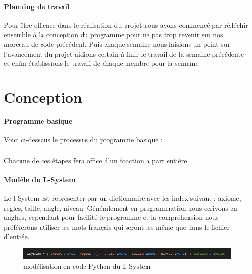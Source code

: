 \documentclass{report}
\begin{document}
 		\paragraph{Planning de travail}
 			Pour être efficace dans le réalisation du projet nous avons commencé par réfléchir ensemble à la conception du programme pour ne pas trop revenir sur nos morceau de code précédent. Puis chaque semaine nous faisions un point sur l'avancement du projet aidions certain à finir le travail de la semaine précédente et enfin établissions le travail de chaque membre pour la semaine 
 	
 	\section{Conception}
 		\paragraph{Programme basique} Voici ci-dessous le processus du programme basique :
 		\begin{center}
		\end{center}
		
		\subparagraph{}
			Chacune de ces étapes fera office d'un fonction a part entière
			
		\paragraph{Modèle du L-System}
			Le l-System est représenter par un dictionnaire avec les index suivant : axiome, regles, taille, angle, niveau. Généralement en programmation nous ecrivons en anglais, cependant pour facilité le programme et la compréhension nous préférerons utiliser les mots français qui seront les même que dans le fichier d’entrée. 
			
			\begin{figure}[h]
				\begin{center}			
					\includegraphics[scale=0.70]{images/modele_lsystem.PNG}
					\caption{modélisation en code Python du L-System}
				\end{center}
			\end{figure}
			
\end{document}
